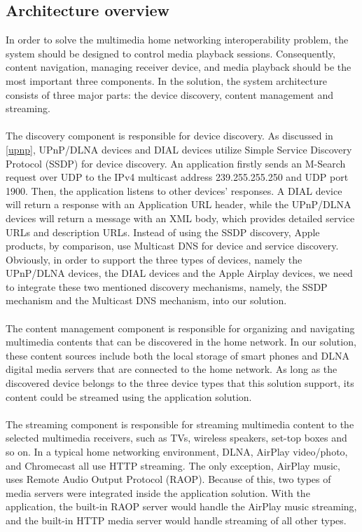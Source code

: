 \subsection{Architecture overview\label{3_1}}
In order to solve the multimedia home networking interoperability problem, the system should be designed to control media playback sessions. Consequently, content navigation, managing receiver device, and media playback should be the most important three components. In the solution, the system architecture consists of three major parts: the device discovery, content management and streaming.\\
\\
The discovery component is responsible for device discovery. As discussed
in \ref{upnp}, UPnP/DLNA devices and DIAL devices utilize Simple Service Discovery
Protocol (SSDP) for device discovery. An application firstly sends an M-Search
request over UDP to the IPv4 multicast address 239.255.255.250 and UDP port 1900. Then, the application listens to other devices' responses. A DIAL device will return a response with an Application URL header, while the UPnP/DLNA devices will return a message with an XML body, which provides detailed service URLs and description URLs. Instead of using the SSDP discovery, Apple products, by comparison, use Multicast DNS for device and service discovery. Obviously, in order to support the three types of devices, namely the UPnP/DLNA devices, the DIAL devices and the Apple Airplay devices, we need to integrate these two mentioned discovery mechanisms, namely, the SSDP mechanism and the Multicast DNS mechanism, into our solution.\\
\\
The content management component is responsible for organizing and
 navigating multimedia contents that can be discovered in the home network. In our solution, these content sources include both the local storage of smart phones and DLNA digital media servers that are connected to the home network. As long as the discovered device belongs to the three device types that this solution support, its content could be streamed using the application solution.\\
\\
The streaming component is responsible for streaming multimedia content to the
selected multimedia receivers, such as TVs, wireless speakers, set-top boxes and so on. In a typical home networking environment, DLNA, AirPlay video/photo, and Chromecast all use HTTP streaming. The only exception, AirPlay music, uses Remote Audio Output Protocol (RAOP). Because of this, two types of media servers were integrated inside the application solution. With the application, the built-in RAOP server would handle the AirPlay music streaming, and the built-in HTTP media server would handle streaming of all other types.

